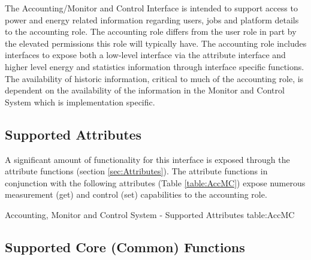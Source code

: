 The Accounting/Monitor and Control Interface is intended to support access to power and energy related information regarding users, jobs and platform details to the accounting role.
The accounting role differs from the user role in part by the elevated permissions this role will typically have.
The accounting role includes interfaces to expose both a low-level interface via the attribute interface and higher level energy and statistics information through interface specific functions.
The availability of historic information, critical to much of the accounting role, is dependent on the availability of the information in the Monitor and Control System which is implementation specific. 


\subsection{Supported Attributes}\label{sec:AccMCAttributes}
A significant amount of functionality for this interface is exposed through the attribute functions (section \ref{sec:Attributes}).
The attribute functions in conjunction with the following attributes (Table \ref{table:AccMC}) expose numerous measurement  (get) and control (set) capabilities to the accounting role.

\begin{attributetable}{Accounting, Monitor and Control System - Supported Attributes }{table:AccMC}
	\aPstateDesc
	\aCstateDesc
	\aCstateLimitDesc
	\aSstateDesc
	\aCurrentDesc
	\aVoltageDesc
	\aPowerDesc
	\aMinPowerDesc
	\aMaxPowerDesc
	\aFreqDesc
	\aFreqLimitMinDesc
	\aFreqLimitMaxDesc
	\aEnergyDesc
	\aTempDesc
\end{attributetable}



\subsection{Supported Core (Common) Functions}\label{sec:AccMCSupportedCommon}


